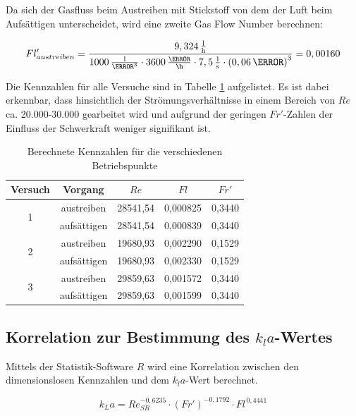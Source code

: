 \documentclass[12pt,liststotoc]{report}
\begin{document}
Da sich der Gasfluss beim Austreiben mit Stickstoff von dem der Luft beim Aufsättigen unterscheidet, wird eine zweite Gas Flow Number berechnen:

\begin{gather*}
    Fl'_{austreiben} = \frac{9,324\,\frac{\text{l}}{\text{h}}}{1000\,\frac{\text{l}}{\m^3} \cdot 3600\,\frac{\s}{\h} \cdot 7,5\,\frac{1}{\text{s}} \cdot \left(0,06\,\m\right)^3} = 0,00160\notag
\end{gather*}

Die Kennzahlen für alle Versuche sind in Tabelle \ref{tab:kennzahlen} aufgelistet. Es ist dabei erkennbar, dass hinsichtlich der Strömungsverhältnisse in einem Bereich von $Re$ ca. 20.000-30.000 gearbeitet wird und aufgrund der geringen $Fr'$-Zahlen der Einfluss der Schwerkraft weniger signifikant ist. 

\begin{table}[H]
  \centering
  \caption{Berechnete Kennzahlen für die verschiedenen Betriebspunkte}
    \begin{tabular}{ccccc}
    \toprule
    Versuch & Vorgang & $Re$    & $Fl$    & $Fr'$ \\
    \midrule
    \multirow{2}[0]{*}{1} & austreiben & 28541,54 & 0,000825 & 0,3440 \\
          & aufsättigen & 28541,54 & 0,000839 & 0,3440 \\
          \midrule
    \multirow{2}[0]{*}{2} & austreiben & 19680,93 & 0,002290 & 0,1529 \\
          & aufsättigen & 19680,93 & 0,002330 & 0,1529 \\
          \midrule
    \multirow{2}[0]{*}{3} & austreiben & 29859,63 & 0,001572 & 0,3440 \\
          & aufsättigen & 29859,63 & 0,001599 & 0,3440 \\
          \bottomrule
    \end{tabular}%
  \label{tab:kennzahlen}%
\end{table}%


\subsection{Korrelation zur Bestimmung des $k_la$-Wertes}
\label{cap:Korrelation}
Mittels der Statistik-Software $R$ wird eine Korrelation zwischen den dimensionslosen Kennzahlen und dem $k_la$-Wert berechnet.

\begin{equation}
    k_La = Re_{SR}^{-0,6235} \cdot \left(Fr'\right)^{-0,1792} \cdot Fl^{\,0,4441}
\end{equation}
\end{document}
